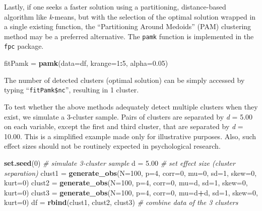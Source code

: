 \documentclass[
  man,floatsintext]{apa6}
\newenvironment{Shaded}{\begin{snugshade}}{\end{snugshade}}
\newcommand{\AttributeTok}[1]{\textcolor[rgb]{0.13,0.29,0.53}{#1}}
\newcommand{\CommentTok}[1]{\textcolor[rgb]{0.56,0.35,0.01}{\textit{#1}}}
\newcommand{\DecValTok}[1]{\textcolor[rgb]{0.00,0.00,0.81}{#1}}
\newcommand{\FloatTok}[1]{\textcolor[rgb]{0.00,0.00,0.81}{#1}}
\newcommand{\FunctionTok}[1]{\textcolor[rgb]{0.13,0.29,0.53}{\textbf{#1}}}
\newcommand{\NormalTok}[1]{#1}
\newcommand{\OtherTok}[1]{\textcolor[rgb]{0.56,0.35,0.01}{#1}}
\newcommand{\SpecialCharTok}[1]{\textcolor[rgb]{0.81,0.36,0.00}{\textbf{#1}}}
\begin{document}
Lastly, if one seeks a faster solution using a partitioning, distance-based algorithm like \emph{k}-means, but with the selection of the optimal solution wrapped in a single existing function, the ``Partitioning Around Medoids'' (PAM) clustering method may be a preferred alternative. The \texttt{pamk} function is implemented in the \texttt{fpc} package.

\begin{Shaded}
\begin{Highlighting}[]
\NormalTok{fitPamk }\OtherTok{=} \FunctionTok{pamk}\NormalTok{(}\AttributeTok{data=}\NormalTok{df, }\AttributeTok{krange=}\DecValTok{1}\SpecialCharTok{:}\DecValTok{5}\NormalTok{, }\AttributeTok{alpha=}\FloatTok{0.05}\NormalTok{)}
\end{Highlighting}
\end{Shaded}

The number of detected clusters (optimal solution) can be simply accessed by typing ``\texttt{fitPamk\$nc}'', resulting in 1 cluster.

To test whether the above methods adequately detect multiple clusters when they exist, we simulate a 3-cluster sample. Pairs of clusters are separated by \emph{d} = 5.00 on each variable, except the first and third cluster, that are separated by \emph{d} = 10.00. This is a simplified example made only for illustrative purposes. Also, such effect sizes should not be routinely expected in psychological research.

\begin{Shaded}
\begin{Highlighting}[]
\FunctionTok{set.seed}\NormalTok{(}\DecValTok{0}\NormalTok{)}
\CommentTok{\# simulate 3{-}cluster sample}
\NormalTok{d }\OtherTok{=} \FloatTok{5.00} \CommentTok{\# set effect size (cluster separation)}
\NormalTok{clust1 }\OtherTok{=} \FunctionTok{generate\_obs}\NormalTok{(}\AttributeTok{N=}\DecValTok{100}\NormalTok{, }\AttributeTok{p=}\DecValTok{4}\NormalTok{, }\AttributeTok{corr=}\DecValTok{0}\NormalTok{, }\AttributeTok{mu=}\DecValTok{0}\NormalTok{,   }\AttributeTok{sd=}\DecValTok{1}\NormalTok{, }\AttributeTok{skew=}\DecValTok{0}\NormalTok{, }\AttributeTok{kurt=}\DecValTok{0}\NormalTok{)}
\NormalTok{clust2 }\OtherTok{=} \FunctionTok{generate\_obs}\NormalTok{(}\AttributeTok{N=}\DecValTok{100}\NormalTok{, }\AttributeTok{p=}\DecValTok{4}\NormalTok{, }\AttributeTok{corr=}\DecValTok{0}\NormalTok{, }\AttributeTok{mu=}\NormalTok{d,   }\AttributeTok{sd=}\DecValTok{1}\NormalTok{, }\AttributeTok{skew=}\DecValTok{0}\NormalTok{, }\AttributeTok{kurt=}\DecValTok{0}\NormalTok{)}
\NormalTok{clust3 }\OtherTok{=} \FunctionTok{generate\_obs}\NormalTok{(}\AttributeTok{N=}\DecValTok{100}\NormalTok{, }\AttributeTok{p=}\DecValTok{4}\NormalTok{, }\AttributeTok{corr=}\DecValTok{0}\NormalTok{, }\AttributeTok{mu=}\NormalTok{d}\SpecialCharTok{+}\NormalTok{d, }\AttributeTok{sd=}\DecValTok{1}\NormalTok{, }\AttributeTok{skew=}\DecValTok{0}\NormalTok{, }\AttributeTok{kurt=}\DecValTok{0}\NormalTok{)}
\NormalTok{df }\OtherTok{=} \FunctionTok{rbind}\NormalTok{(clust1, clust2, clust3) }\CommentTok{\# combine data of the 3 clusters}
\end{Highlighting}
\end{Shaded}
\end{document}
